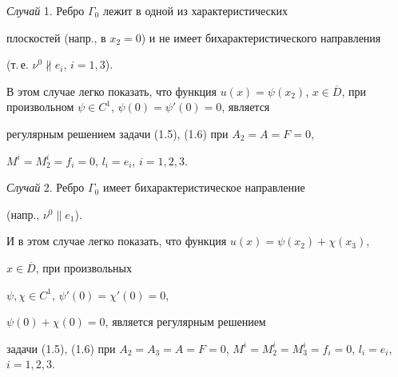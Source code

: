 {\it Случай} 1. Ребро $\Gamma_0$ лежит в одной из характеристических


плоскостей (напр., в $x_2=0$) и не имеет бихарактеристического направления


(т.\,е. $\nu^0 \nparallel e_i$, $i=1,3$).





В этом случае легко показать, что функция $u(x)=\psi (x_2)$, $x\in


\overline D$, при произвольном $\psi\in C^1$, $\psi(0)=\psi'(0)=0$, является


регулярным решением задачи (1.5), (1.6) при $A_2=A=F=0$,


$M^i=M_2^i=f_i=0$, $l_i=e_i$, $i=1,2,3$.


\medskip





{\it Случай} 2. Ребро $\Gamma_0$ имеет бихарактеристическое направление


(напр., $\nu^0 \| e_1$).





И в этом случае легко показать, что функция $u(x)=\psi(x_2)+\chi(x_3)$,


$x \in \overline D$, при произвольных


$\psi,\chi \in C^1$, $\psi'(0)=\chi'(0)=0$,


$\psi (0)+\chi (0)=0$, является регулярным решением 


задачи (1.5), (1.6) при $A_2=A_3=A=F=0$, $M^i=M_2^i=M_3^i=


f_i=0$, $l_i=e_i$, $i=1,2,3$.








